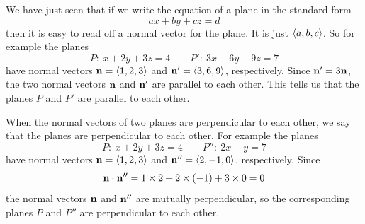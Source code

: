 \begin{eg}\label{eg:VPparallel-normal-Planes}
We have just seen that if we write the equation of a plane in the standard
form 
$$
ax+by+cz=d
$$ 
then it is easy to read off a normal vector for the plane.
It is just $\left< a,b,c\right>$. So for example the planes
\begin{equation*}
P:\ x+2y+3z=4 \qquad
P':\ 3x+6y+9z=7
\end{equation*}
have normal vectors $\mathbf{n}=\left< 1,2,3\right>$ and $\mathbf{n}'=\left< 3,6,9\right>$, 
respectively. Since $\mathbf{n}'=3\mathbf{n}$, the two normal vectors $\mathbf{n}$ and $\mathbf{n}'$ 
are parallel to each other. This tells us that the planes $P$ and $P'$ 
are parallel to each other.

When the normal vectors of two planes are perpendicular to each other,
we say that 
the planes are perpendicular to each other. For example
the planes 
\begin{equation*}
P:\ x+2y+3z=4 \qquad
P'':\ 2x-y=7
\end{equation*}
have normal vectors  $\mathbf{n}=\left< 1,2,3\right>$ and $\mathbf{n}''=\left< 2,-1,0\right>$, 
respectively. Since
\begin{equation*}
\mathbf{n}\cdot\mathbf{n}'' = 1\times 2+2\times(-1)+3\times 0 = 0
\end{equation*}
the normal vectors $\mathbf{n}$ and $\mathbf{n}''$ are mutually perpendicular,
so the corresponding planes $P$ and $P''$ are perpendicular to each other.
\end{eg}
\goodbreak

